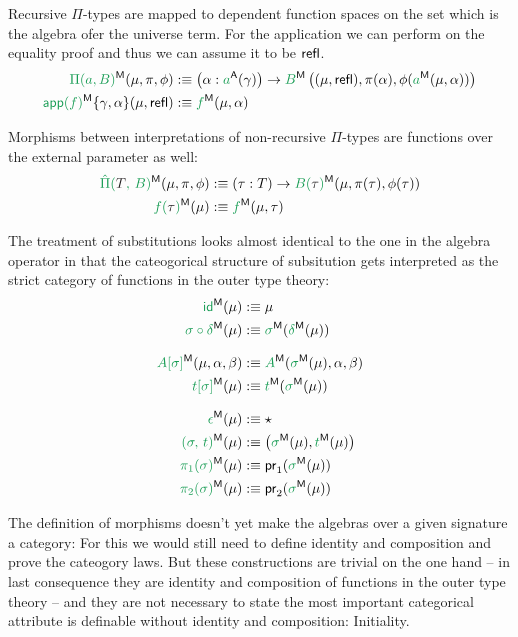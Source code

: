 Recursive $\Pi$-types are mapped to dependent function spaces on the
set which is the algebra ofer the universe term.
For the application we can perform on the equality proof and
thus we can assume it to be $\mathsf{refl}$.
\begin{align*}
\grm{\Pi(a, B)}^\MM(\mu, \pi, \phi)
  &:\equiv \left(\alpha : \grm{a}^\CC(\gamma)\right)
    \to \grm{B}^\MM\left((\mu, \refl), \pi(\alpha), \phi(\grm{a}^\MM(\mu, \alpha))\right) \\
\grm{\IIapp(f)}^\MM\{\gamma, \alpha\}(\mu, \refl)
  &:\equiv \grm{f}^\MM(\mu, \alpha)
\end{align*}

Morphisms between interpretations of non-recursive $\Pi$-types are functions over
the external parameter as well:
\begin{align*}
\grm{\ExtPi{T}{B}}^\MM(\mu, \pi, \phi)
  &:\equiv (\tau : T) \to \grm{B(\bltau)}^\MM(\mu, \pi(\tau), \phi(\tau)) \\
\grm{f(\bltau)}^\MM(\mu)
  &:\equiv \grm{f}^\MM(\mu, \tau)
\end{align*}

The treatment of substitutions looks almost identical to the one in the algebra
operator in that the cateogorical structure of subsitution gets interpreted
as the strict category of functions in the outer type theory:
\begin{align*}
\grm{\id}^\MM(\mu)
  &:\equiv \mu \\
\grm{\sigma \circ \delta}^\MM(\mu)
  &:\equiv \grm{\sigma}^\MM(\grm{\delta}^\MM(\mu)) \\[.7em]
\grm{A[\sigma]}^\MM(\mu, \alpha, \beta)
  &:\equiv \grm{A}^\MM(\grm{\sigma}^\MM(\mu), \alpha, \beta) \\
\grm{t[\sigma]}^\MM(\mu)
  &:\equiv \grm{t}^\MM(\grm{\sigma}^\MM(\mu)) \\[.7em]
\grm{\epsilon}^\MM(\mu)
  &:\equiv \star \\
\grm{(\sigma,\,t)}^\MM(\mu)
  &:\equiv \left(\grm{\sigma}^\MM(\mu), \grm{t}^\MM(\mu)\right) \\
\grm{\pi_1(\sigma)}^\MM(\mu)
  &:\equiv \pr_1(\grm{\sigma}^\MM(\mu)) \\
\grm{\pi_2(\sigma)}^\MM(\mu)
  &:\equiv \pr_2(\grm{\sigma}^\MM(\mu))
\end{align*}

The definition of morphisms doesn't yet make the algebras over a given
signature \grm{\Gamma} a category: For this we would still need to define
identity and composition and prove the cateogory laws.
But these constructions are trivial on the one hand -- in last consequence
they are identity and composition of functions in the outer type theory --
and they are not necessary to state the most important categorical attribute
is definable without identity and composition:
Initiality.

